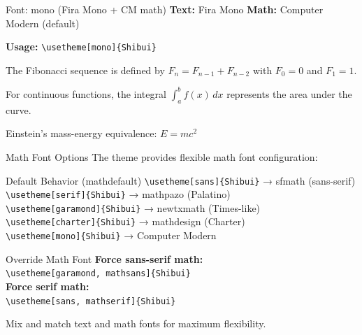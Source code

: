 \documentclass[aspectratio=169]{beamer}
\begin{document}
\begin{frame}{Font: mono (Fira Mono + CM math)}
  \textbf{Text:} Fira Mono \quad \textbf{Math:} Computer Modern (default)

  \vspace{0.5em}

  \textbf{Usage:} \texttt{\textbackslash usetheme[mono]\{Shibui\}}

  \vspace{1em}

  {\selectfont
  The Fibonacci sequence is defined by $F_n = F_{n-1} + F_{n-2}$ with $F_0 = 0$ and $F_1 = 1$.

  For continuous functions, the integral $\int_a^b f(x)\,dx$ represents the area under the curve.

  Einstein's mass-energy equivalence: $E = mc^2$}
\end{frame}

\begin{frame}[fragile]{Math Font Options}
  The theme provides flexible math font configuration:

  \vspace{0.5em}

  \begin{shibuiframe}{Default Behavior (mathdefault)}
    \texttt{\textbackslash usetheme[sans]\{Shibui\}} → sfmath (sans-serif) \\
    \texttt{\textbackslash usetheme[serif]\{Shibui\}} → mathpazo (Palatino) \\
    \texttt{\textbackslash usetheme[garamond]\{Shibui\}} → newtxmath (Times-like) \\
    \texttt{\textbackslash usetheme[charter]\{Shibui\}} → mathdesign (Charter) \\
    \texttt{\textbackslash usetheme[mono]\{Shibui\}} → Computer Modern
  \end{shibuiframe}

  \vspace{0.5em}

  \begin{shibuiframe}{Override Math Font}
    \textbf{Force sans-serif math:} \\
    \texttt{\textbackslash usetheme[garamond, mathsans]\{Shibui\}} \\
    \vspace{0.3em}
    \textbf{Force serif math:} \\
    \texttt{\textbackslash usetheme[sans, mathserif]\{Shibui\}}
  \end{shibuiframe}

  \vspace{0.5em}

  \small Mix and match text and math fonts for maximum flexibility.
\end{frame}
\end{document}
